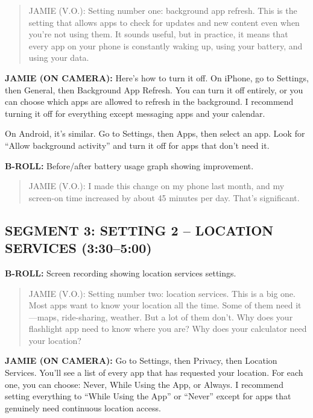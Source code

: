 \documentclass[
    language=english,
    doctype=video-script,
    institution=none,
]{../../omnilatex}
\begin{document}
\begin{quote}
JAMIE (V.O.): Setting number one: background app refresh. This is the setting that allows apps to check for updates and new content even when you're not using them. It sounds useful, but in practice, it means that every app on your phone is constantly waking up, using your battery, and using your data.
\end{quote}

\textbf{JAMIE (ON CAMERA):} Here's how to turn it off. On iPhone, go to Settings, then General, then Background App Refresh. You can turn it off entirely, or you can choose which apps are allowed to refresh in the background. I recommend turning it off for everything except messaging apps and your calendar.

On Android, it's similar. Go to Settings, then Apps, then select an app. Look for ``Allow background activity'' and turn it off for apps that don't need it.

\textbf{B-ROLL:} Before/after battery usage graph showing improvement.

\begin{quote}
JAMIE (V.O.): I made this change on my phone last month, and my screen-on time increased by about 45 minutes per day. That's significant.
\end{quote}

\subsection*{SEGMENT 3: SETTING 2 -- LOCATION SERVICES (3:30--5:00)}

\textbf{B-ROLL:} Screen recording showing location services settings.

\begin{quote}
JAMIE (V.O.): Setting number two: location services. This is a big one. Most apps want to know your location all the time. Some of them need it---maps, ride-sharing, weather. But a lot of them don't. Why does your flashlight app need to know where you are? Why does your calculator need your location?
\end{quote}

\textbf{JAMIE (ON CAMERA):} Go to Settings, then Privacy, then Location Services. You'll see a list of every app that has requested your location. For each one, you can choose: Never, While Using the App, or Always. I recommend setting everything to ``While Using the App'' or ``Never'' except for apps that genuinely need continuous location access.
\end{document}
